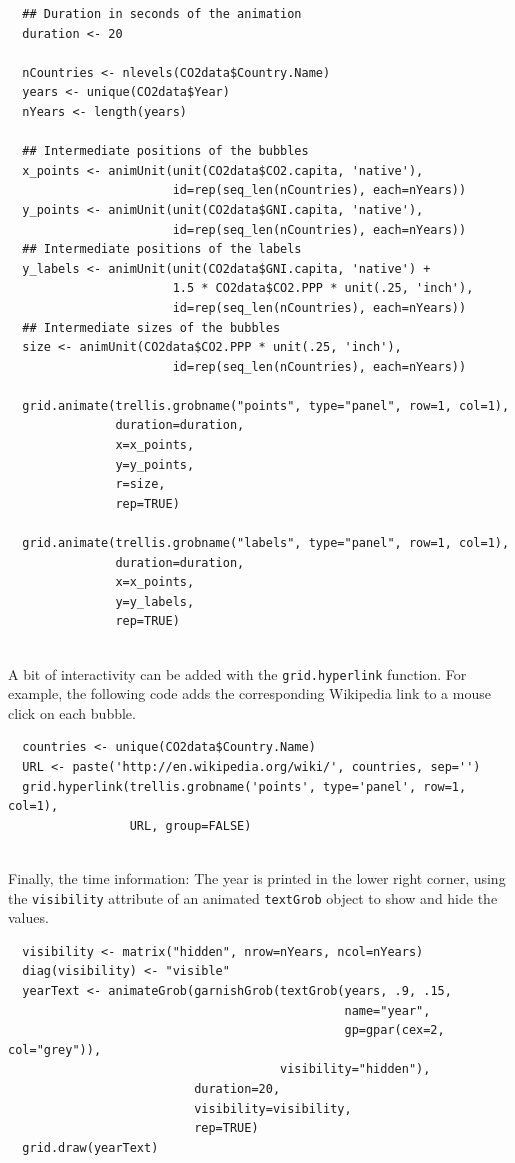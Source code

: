 \documentclass[smallroyalvopaper]{memoir}
\begin{document}
\lstset{language=r,label= ,caption= ,captionpos=b,numbers=none}
\begin{lstlisting}
  ## Duration in seconds of the animation
  duration <- 20
  
  nCountries <- nlevels(CO2data$Country.Name)
  years <- unique(CO2data$Year)
  nYears <- length(years)
  
  ## Intermediate positions of the bubbles
  x_points <- animUnit(unit(CO2data$CO2.capita, 'native'),
                       id=rep(seq_len(nCountries), each=nYears))
  y_points <- animUnit(unit(CO2data$GNI.capita, 'native'),
                       id=rep(seq_len(nCountries), each=nYears))
  ## Intermediate positions of the labels
  y_labels <- animUnit(unit(CO2data$GNI.capita, 'native') +
                       1.5 * CO2data$CO2.PPP * unit(.25, 'inch'),
                       id=rep(seq_len(nCountries), each=nYears))
  ## Intermediate sizes of the bubbles
  size <- animUnit(CO2data$CO2.PPP * unit(.25, 'inch'),
                       id=rep(seq_len(nCountries), each=nYears))
  
  grid.animate(trellis.grobname("points", type="panel", row=1, col=1),
               duration=duration,
               x=x_points,
               y=y_points,
               r=size,
               rep=TRUE)
  
  grid.animate(trellis.grobname("labels", type="panel", row=1, col=1),
               duration=duration,
               x=x_points,
               y=y_labels,
               rep=TRUE)
  
\end{lstlisting}

A bit of interactivity can be added with the \texttt{grid.hyperlink}
function. For example, the following code adds the corresponding
Wikipedia link to a mouse click on each bubble.


\lstset{language=r,label= ,caption= ,captionpos=b,numbers=none}
\begin{lstlisting}
  countries <- unique(CO2data$Country.Name)
  URL <- paste('http://en.wikipedia.org/wiki/', countries, sep='')
  grid.hyperlink(trellis.grobname('points', type='panel', row=1, col=1),
                 URL, group=FALSE)
  
\end{lstlisting}

Finally, the time information: The year is printed in the lower
right corner, using the \texttt{visibility} attribute of an animated
\texttt{textGrob} object to show and hide the values.
\lstset{language=r,label= ,caption= ,captionpos=b,numbers=none}
\begin{lstlisting}
  visibility <- matrix("hidden", nrow=nYears, ncol=nYears)
  diag(visibility) <- "visible"
  yearText <- animateGrob(garnishGrob(textGrob(years, .9, .15,
                                               name="year",
                                               gp=gpar(cex=2, col="grey")),
                                      visibility="hidden"),
                          duration=20,
                          visibility=visibility,
                          rep=TRUE)
  grid.draw(yearText)
\end{lstlisting}
\end{document}
